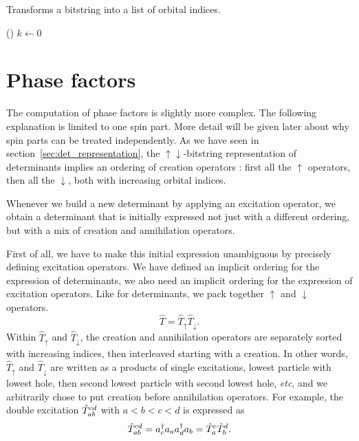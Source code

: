 \documentclass[./thesis.tex]{subfiles}
\begin{document}
\begin{algorithm}[h!]
	\caption{Transforms a bitstring into a list of orbital indices.}
	\label{alg:LIST_FROM_BITSTRING}
	
	\Fn(){}{
		$k \gets 0$ \;
		}
		
\end{algorithm}



\section{Phase factors}


The computation of phase factors is slightly more complex. The following explanation is limited to one spin part. More detail will be given later about why spin parts can be treated independently.
As we have seen in section~\ref{sec:det_representation}, the $\uparrow \downarrow$-bitstring representation of determinants implies an ordering of creation operators : first all the $\uparrow$ operators, then all the $\downarrow$, both with increasing orbital indices.

Whenever we build a new determinant by applying an excitation operator, we obtain a determinant that is initially expressed not just with a different ordering, but with a mix of creation and annihilation operators.

First of all, we have to make this initial expression unambiguous by precisely defining excitation operators. We have defined an implicit ordering for the expression of determinants, we also need an implicit ordering for the expression of excitation operators.
Like for determinants, we pack together $\uparrow$ and $\downarrow$ operators.
\begin{equation}
\label{eq:spinpackexc}
\hat T = \hat T_\uparrow \hat T_\downarrow.
\end{equation}
Within $\hat T_\uparrow$ and $\hat T_\downarrow$, the creation and annihilation operators are separately sorted with increasing indices, then interleaved starting with a creation. In other words, $\hat T_\uparrow$ and $\hat T_\downarrow$ are written as a products of single excitations, lowest particle with lowest hole, then second lowest particle with second lowest hole, \textit{etc}, and we arbitrarily chose to put creation before annihilation operators.
For example, the double excitation ${\hat{T}_{ab}^{cd}}$ with $a<b<c<d$ is expressed as
\begin{equation}
\hat T_{ab}^{cd} = a^\dagger_{c} a_{a} a^\dagger_{d} a_{b} = \hat T_a^c \hat T_b^d.
\end{equation}
\end{document}
